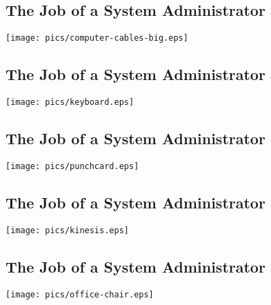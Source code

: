 \documentclass[xga]{xdvislides}
\begin{document}
\subsection{The Job of a System Administrator}
\vspace*{\fill}
\begin{center}
	\texttt{[image: pics/computer-cables-big.eps]} \\
\end{center}
\vspace*{\fill}

\subsection{The Job of a System Administrator}
\vspace*{\fill}
\begin{center}
	\texttt{[image: pics/keyboard.eps]} \\
\end{center}
\vspace*{\fill}

\subsection{The Job of a System Administrator}
\vspace*{\fill}
\begin{center}
	\texttt{[image: pics/punchcard.eps]} \\
\end{center}
\vspace*{\fill}

\subsection{The Job of a System Administrator}
\vspace*{\fill}
\begin{center}
	\texttt{[image: pics/kinesis.eps]} \\
\end{center}
\vspace*{\fill}

\subsection{The Job of a System Administrator}
\vspace*{\fill}
\begin{center}
	\texttt{[image: pics/office-chair.eps]} \\
\end{center}
\vspace*{\fill}
\end{document}
